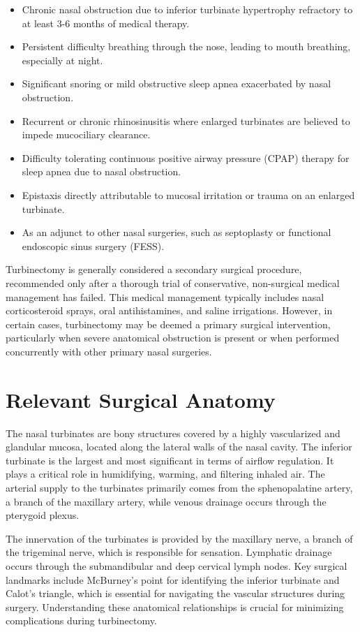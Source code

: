 \begin{itemize}
  \item Chronic nasal obstruction due to inferior turbinate hypertrophy refractory to at least 3-6 months of medical therapy.
  \item Persistent difficulty breathing through the nose, leading to mouth breathing, especially at night.
  \item Significant snoring or mild obstructive sleep apnea exacerbated by nasal obstruction.
  \item Recurrent or chronic rhinosinusitis where enlarged turbinates are believed to impede mucociliary clearance.
  \item Difficulty tolerating continuous positive airway pressure (CPAP) therapy for sleep apnea due to nasal obstruction.
  \item Epistaxis directly attributable to mucosal irritation or trauma on an enlarged turbinate.
  \item As an adjunct to other nasal surgeries, such as septoplasty or functional endoscopic sinus surgery (FESS).
\end{itemize}

Turbinectomy is generally considered a secondary surgical procedure, recommended only after a thorough trial of conservative, non-surgical medical management has failed. This medical management typically includes nasal corticosteroid sprays, oral antihistamines, and saline irrigations. However, in certain cases, turbinectomy may be deemed a primary surgical intervention, particularly when severe anatomical obstruction is present or when performed concurrently with other primary nasal surgeries.

\section*{Relevant Surgical Anatomy}
The nasal turbinates are bony structures covered by a highly vascularized and glandular mucosa, located along the lateral walls of the nasal cavity. The inferior turbinate is the largest and most significant in terms of airflow regulation. It plays a critical role in humidifying, warming, and filtering inhaled air. The arterial supply to the turbinates primarily comes from the sphenopalatine artery, a branch of the maxillary artery, while venous drainage occurs through the pterygoid plexus. 

The innervation of the turbinates is provided by the maxillary nerve, a branch of the trigeminal nerve, which is responsible for sensation. Lymphatic drainage occurs through the submandibular and deep cervical lymph nodes. Key surgical landmarks include McBurney's point for identifying the inferior turbinate and Calot's triangle, which is essential for navigating the vascular structures during surgery. Understanding these anatomical relationships is crucial for minimizing complications during turbinectomy.


